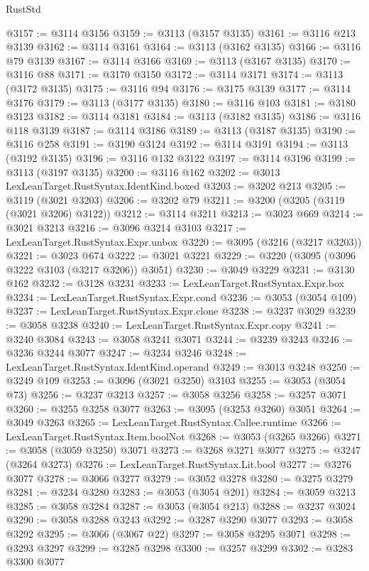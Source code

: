 \begin{lexlean}{RustStd}
\begin{coremodule}
{\begin{coremodule}
{{{{{{{{{{{{{{{{{{{{{{{{{{{{{{{{@3157 := @3114 @3156
@3159 := @3113 (@3157 @3135)
@3161 := @3116 @213 @3139
@3162 := @3114 @3161
@3164 := @3113 (@3162 @3135)
@3166 := @3116 @79 @3139
@3167 := @3114 @3166
@3169 := @3113 (@3167 @3135)
@3170 := @3116 @88
@3171 := @3170 @3150
@3172 := @3114 @3171
@3174 := @3113 (@3172 @3135)
@3175 := @3116 @94
@3176 := @3175 @3139
@3177 := @3114 @3176
@3179 := @3113 (@3177 @3135)
@3180 := @3116 @103
@3181 := @3180 @3123
@3182 := @3114 @3181
@3184 := @3113 (@3182 @3135)
@3186 := @3116 @118 @3139
@3187 := @3114 @3186
@3189 := @3113 (@3187 @3135)
@3190 := @3116 @258
@3191 := @3190 @3124
@3192 := @3114 @3191
@3194 := @3113 (@3192 @3135)
@3196 := @3116 @132 @3122
@3197 := @3114 @3196
@3199 := @3113 (@3197 @3135)
@3200 := @3116 @162
@3202 := @3013 LexLeanTarget.RustSyntax.IdentKind.boxed
@3203 := @3202 @213
@3205 := @3119 (@3021 @3203)
@3206 := @3202 @79
@3211 := @3200 (@3205 (@3119 (@3021 @3206) @3122))
@3212 := @3114 @3211
@3213 := @3023 @669
@3214 := @3021 @3213
@3216 := @3096 @3214 @3103
@3217 := LexLeanTarget.RustSyntax.Expr.unbox
@3220 := @3095 (@3216 (@3217 @3203))
@3221 := @3023 @674
@3222 := @3021 @3221
@3229 := @3220 (@3095 (@3096 @3222 @3103 (@3217 @3206)) @3051)
@3230 := @3049 @3229
@3231 := @3130 @162
@3232 := @3128 @3231
@3233 := LexLeanTarget.RustSyntax.Expr.box
@3234 := LexLeanTarget.RustSyntax.Expr.cond
@3236 := @3053 (@3054 @109)
@3237 := LexLeanTarget.RustSyntax.Expr.clone
@3238 := @3237 @3029
@3239 := @3058 @3238
@3240 := LexLeanTarget.RustSyntax.Expr.copy
@3241 := @3240 @3084
@3243 := @3058 @3241 @3071
@3244 := @3239 @3243
@3246 := @3236 @3244 @3077
@3247 := @3234 @3246
@3248 := LexLeanTarget.RustSyntax.IdentKind.operand
@3249 := @3013 @3248
@3250 := @3249 @109
@3253 := @3096 (@3021 @3250) @3103
@3255 := @3053 (@3054 @73)
@3256 := @3237 @3213
@3257 := @3058 @3256
@3258 := @3257 @3071
@3260 := @3255 @3258 @3077
@3263 := @3095 (@3253 @3260) @3051
@3264 := @3049 @3263
@3265 := LexLeanTarget.RustSyntax.Callee.runtime
@3266 := LexLeanTarget.RustSyntax.Item.boolNot
@3268 := @3053 (@3265 @3266)
@3271 := @3058 (@3059 @3250) @3071
@3273 := @3268 @3271 @3077
@3275 := @3247 (@3264 @3273)
@3276 := LexLeanTarget.RustSyntax.Lit.bool
@3277 := @3276 @3077
@3278 := @3066 @3277
@3279 := @3052 @3278
@3280 := @3275 @3279
@3281 := @3234 @3280
@3283 := @3053 (@3054 @201)
@3284 := @3059 @3213
@3285 := @3058 @3284
@3287 := @3053 (@3054 @213)
@3288 := @3237 @3024
@3290 := @3058 @3288 @3243
@3292 := @3287 @3290 @3077
@3293 := @3058 @3292
@3295 := @3066 (@3067 @22)
@3297 := @3058 @3295 @3071
@3298 := @3293 @3297
@3299 := @3285 @3298
@3300 := @3257 @3299
@3302 := @3283 @3300 @3077
}}}}}}}}}}}}}}}}}}}}}}}}}}}}}}}}
\end{coremodule}}
\end{coremodule}
\end{lexlean}
